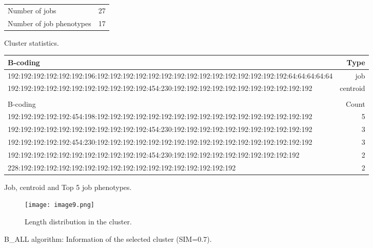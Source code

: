 \documentclass{jhps}
\begin{document}
\begin{figure}
	\begin{subtable}{\textwidth}
		\centering
		\begin{tabular}{ll}
			Number of jobs & 27 \\
			Number of job phenotypes & 17 \\
		\end{tabular}
		\caption{Cluster statistics.}
		\label{cluster:use_case:bin_all:stats}
	\end{subtable}
	\medskip
	\begin{subtable}{\textwidth}
		\centering
		\begin{tiny}
			\begin{tabular}{l|r}
				\rowcolor{tblhead}
				B-coding                                                                                          &  Type     \\
				\hline
				192:192:192:192:192:192:196:192:192:192:192:192:192:192:192:192:192:192:192:192:192:192:64:64:64:64:64 &  job      \\
				192:192:192:192:192:192:192:192:192:192:192:454:230:192:192:192:192:192:192:192:192:192:192:192        &  centroid \\
				\multicolumn{2}{l}{}                                                                                   \\
				\rowcolor{tblhead}
				B-coding                                                                                          &  Count    \\
				\hline
				192:192:192:192:192:454:198:192:192:192:192:192:192:192:192:192:192:192:192:192:192:192:192:192        &  5        \\
				192:192:192:192:192:192:192:192:192:192:192:454:230:192:192:192:192:192:192:192:192:192:192:192        &  3        \\
				192:192:192:192:192:454:230:192:192:192:192:192:192:192:192:192:192:192:192:192:192:192:192:192        &  3        \\
				192:192:192:192:192:192:192:192:192:192:192:454:230:192:192:192:192:192:192:192:192:192:192            &  2        \\
				228:192:192:192:192:192:192:192:192:192:192:192:192:192:192:192:192:192                                &  2        \\
			\end{tabular}
		\end{tiny}
		\caption{Job, centroid and Top 5 job phenotypes.}
		\label{cluster:use_case:bin_all:top_jobs}
	\end{subtable}
	\medskip
	\begin{subfigure}{\textwidth}
		\centering
		\texttt{[image: image9.png]}
		\caption{Length distribution in the cluster.}
		\label{cluster:use_case:bin_all:length}
	\end{subfigure}
	\caption{B\_ALL algorithm: Information of the selected cluster (SIM=0.7).}
	\label{cluster:use_case:bin}
\end{figure}
\end{document}
